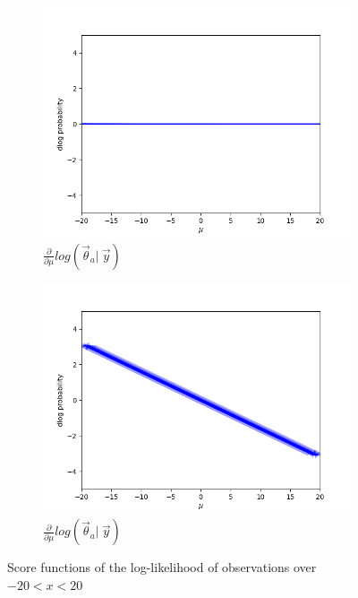 \begin{figure}[H]
    \centering
    \begin{subfigure}{0.475\textwidth}
        \includegraphics[width=\textwidth]{figs/background/deriv_var_10.png}
        \caption[]{$\frac{\partial}{\partial\mu} log(\vec{\theta}_a |\ \vec{y})$}
    \end{subfigure}
    \begin{subfigure}{0.475\textwidth}
        \includegraphics[width=\textwidth]{figs/background/deriv_var_0.5.png}
        \caption[]{$\frac{\partial}{\partial\mu} log(\vec{\theta}_a |\ \vec{y})$}
    \end{subfigure}
    \caption{Score functions of the log-likelihood of observations over $-20<x<20$}
    \label{fig:scorefunctions}
\end{figure}
